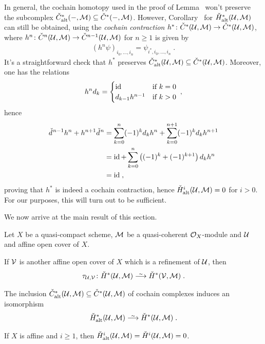 \documentclass[a4paper,parskip=half,numbers=enddot, DIV=12]{scrreprt}
\begin{document}
\begin{rem}
	In general, the cochain homotopy used in the proof of Lemma~ won't preserve the subcomplex $\check{C}_{\mathrm{alt}}^*(-,\mathcal{M})\subseteq\check{C}^*(-,\mathcal{M})$. However, Corollary~ for $\check{H}_{\mathrm{alt}}^*(\mathcal{U},\mathcal{M})$ can still be obtained, using the \emph{cochain contraction} $h^*\colon \check{C}^*(\Uu,\Mm)\morphism\check{C}^*(\Uu,\Mm)$, where $h^n\colon \check{C}^n(\Uu,\Mm)\morphism\check{C}^{n-1}(\Uu,\Mm)$ for $n\geq 1$ is given by
	\begin{align*}
		(h^n\psi)_{i_0,\ldots,i_n}=\psi_{i^*,i_0,\ldots,i_n}\;.
	\end{align*}
	It's a straightforward check that $h^*$ preserves $\check{C}_{\mathrm{alt}}^*(\mathcal{U},\mathcal{M})\subseteq \check{C}^*(\mathcal{U},\mathcal{M})$. Moreover, one has the relations
	\begin{align*}
		h^nd_k=\begin{cases}
			\operatorname{id} &\text{if }k=0\\
			d_{k-1}h^{n-1} & \text{if }k>0
		\end{cases}\;,
	\end{align*}
	hence
	\begin{align*}
		\check{d}\hspace{0.06125em}^{n-1}h^n+h^{n+1}\check{d}\hspace{0.06125em}^n&=\sum_{k=0}^{n}(-1)^kd_kh^n+\sum_{k=0}^{n+1}(-1)^kd_kh^{n+1}\\
		&=\operatorname{id}+\sum_{k=0}^{n}\left((-1)^k+(-1)^{k+1}\right)d_kh^n\\
		&=\operatorname{id}\;,
	\end{align*}
	proving that $h^*$ is indeed a cochain contraction, hence $\check{H}_{\mathrm{alt}}^i(\mathcal{U},\mathcal{M})=0$ for $i>0$. For our purposes, this will turn out to be sufficient.
\end{rem}
We now arrive at the main result of this section.
\begin{prop}
	 Let $X$ be a quasi-compact scheme, $\mathcal{M}$ be a quasi-coherent $\mathcal{O}_X$-module and $\mathcal{U}$ and affine open cover of $X$.
	\begin{alphanumerate}
		\item If $\mathcal{V}$ is another affine open cover of $X$ which is a refinement of $\mathcal{U}$, then
		\begin{align*}
			\tau_{\Uu,\Vv}\colon \check{H}^*(\Uu,\Mm)\isomorphism\check{H}^*(\Vv,\Mm)\;.
		\end{align*}
		\item The inclusion $\check{C}_{\mathrm{alt}}^*(\mathcal{U},\mathcal{M})\subseteq \check{C}^*(\mathcal{U},\mathcal{M})$ of cochain complexes induces an isomorphism
		\begin{align*}
			\check{H}_\alt^*(\Uu,\Mm)\isomorphism\check{H}^*(\Uu,\Mm)\;.
		\end{align*}
		\item If $X$ is affine and $i\geq 1$, then $\check{H}_{\mathrm{alt}}^i(\mathcal{U},\mathcal{M})=\check{H}^i(\mathcal{U},\mathcal{M})=0$.
	\end{alphanumerate}
\end{prop}
\end{document}
